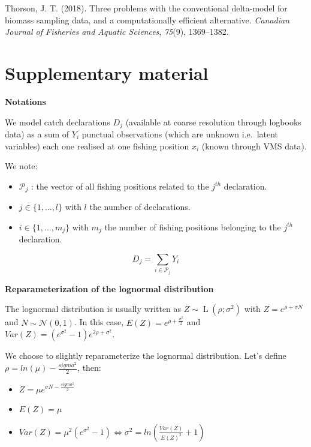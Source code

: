 \documentclass[
  english,
  man,floatsintext]{apa6}
\begin{document}
\leavevmode\hypertarget{ref-thorson_three_2018}{}%
Thorson, J. T. (2018). Three problems with the conventional delta-model for biomass sampling data, and a computationally efficient alternative. \emph{Canadian Journal of Fisheries and Aquatic Sciences}, \emph{75}(9), 1369--1382.

\endgroup

\hypertarget{supplementary-material}{%
\section{Supplementary material}\label{supplementary-material}}

\textbf{Notations}

We model catch declarations \(D_j\) (available at coarse resolution through logbooks data) as a sum of \(Y_{i}\) punctual observations (which are unknown i.e.~latent variables) each one realised at one fishing position \(x_{i}\) (known through VMS data).

We note:

\begin{itemize}
\item
  \(\mathcal{P}_j\) : the vector of all fishing positions related to the \(j^{th}\) declaration.
\item
  \(j \in \{1,...,l\}\) with \(l\) the number of declarations.
\item
  \(i \in \{1,...,m_j\}\) with \(m_j\) the number of fishing positions belonging to the \(j^{th}\) declaration.
\end{itemize}

\[D_j=\sum_{i \in \mathcal{P}_j}{Y_{i}}\]

\textbf{Reparameterization of the lognormal distribution}

The lognormal distribution is usually written as \(Z \sim \operatorname{L}(\rho;\sigma^2)\) with \(Z=e^{\rho+\sigma N}\) and \(N \sim \mathcal{N}(0,1)\). In this case, \(E(Z)=e^{\rho + \frac{\sigma^2}{2}}\) and \(Var(Z)=(e^{\sigma^2}-1)e^{2 \rho + \sigma^2}\).

We choose to slightly reparameterize the lognormal distribution. Let's define \(\rho = ln(\mu) - \frac{sigma^2}{2}\), then:

\begin{itemize}
\item
  \(Z=\mu e^{\sigma N - \frac{sigma^2}{2}}\)
\item
  \(E(Z)=\mu\)
\item
  \(Var(Z)=\mu^2(e^{\sigma^2} - 1) \Leftrightarrow \sigma^2=ln(\frac{Var(Z)}{E(Z)^2} + 1)\)
\end{itemize}
\end{document}
